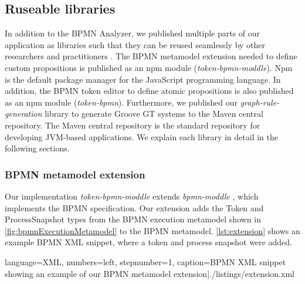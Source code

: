 \documentclass{lmcs} %
\begin{document}


\subsection{Ruseable libraries}
In addition to the BPMN Analyzer, we published multiple parts of our application as libraries such that they can be reused seamlessly by other researchers and practitioners \cite{timkrauterLMCS2024Artifacts2023}.
The BPMN metamodel extension needed to define custom propositions is published as an npm module (\textit{token-bpmn-moddle}).
Npm is the default package manager for the JavaScript programming language.
In addition, the BPMN token editor to define atomic propositions is also published as an npm module (\textit{token-bpmn}).
Furthermore, we published our \textit{graph-rule-generation} library to generate Groove GT systems to the Maven central repository.
The Maven central repository is the standard repository for developing JVM-based applications.
We explain each library in detail in the following sections.

\subsubsection{BPMN metamodel extension}
Our implementation \textit{token-bpmn-moddle} \cite{timkrauterLMCS2024Artifacts2023} extends \textit{bpmn-moddle} \cite{camundaservicesgmbhBpmnmoddle2023}, which implements the BPMN specification.
Our extension adds the \textsf{Token} and \textsf{ProcessSnapshot} types from the BPMN execution metamodel shown in \autoref{fig:bpmnExecutionMetamodel} to the BPMN metamodel.
\autoref{lst:extension} shows an example BPMN XML snippet, where a token and process snapshot were added.

 language=XML, numbers=left,
    stepnumber=1, caption=BPMN XML snippet showing an example of our BPMN metamodel extension]{./listings/extension.xml}
\end{document}

